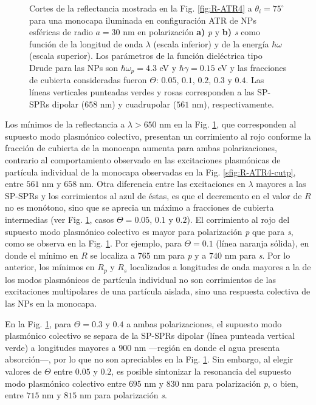 \begin{figure}[h!]
	\caption{
Cortes de la reflectancia mostrada en la Fig. \ref{fig:R-ATR4} a $\theta_i = 75^\circ$ para una monocapa iluminada en configuración ATR de NPs esféricas de radio $a=30$ nm en polarización \textbf{a)} \emph{p} y \textbf{b)} \emph{s} como función de la longitud de onda $\lambda$ (escala inferior) y de la energía $\hbar\omega$ (escala superior). Los parámetros de la función dieléctrica tipo Drude para las NPs son $\hbar\omega_p = 4.3$ eV y $\hbar\gamma = 0.15$ eV y las fracciones de cubierta consideradas fueron $\Theta$: $0. 05$, $0. 1$, $0. 2$, $0. 3$ y $0. 4$. Las líneas verticales punteadas verdes y rosas corresponden a las SP-SPRs dipolar ($658$ nm) y cuadrupolar ($561$ nm), respectivamente. }\label{fig:R-ATR4-Cuts}
	\end{figure}

Los mínimos de la reflectancia a $\lambda>650$ nm en la Fig. \ref{fig:R-ATR4-Cuts}, que corresponden al supuesto modo plasmónico colectivo, presentan un corrimiento al rojo conforme la fracción de cubierta de la monocapa aumenta  para ambas polarizaciones, contrario al comportamiento observado en las excitaciones plasmónicas de partícula individual de la monocapa observadas en la Fig. \ref{sfig:R-ATR4-cutp}, entre $561$ nm y $658$ nm. Otra diferencia entre las excitaciones en $\lambda$ mayores a las SP-SPRs y los corrimientos al azul de éstas, es que el decremento en el valor de $R$ no es monótono, sino que se aprecia un máximo a fracciones de cubierta intermedias (ver Fig. \ref{fig:R-ATR4-Cuts}, casos $\Theta=0.05$, $0.1$ y $0.2$). El corrimiento al rojo del supuesto modo plasmónico colectivo es mayor para  polarización \emph{p} que para \emph{s}, como se observa en la Fig. \ref{fig:R-ATR4-Cuts}. Por ejemplo, para $\Theta=0.1$ (línea naranja sólida), en donde el mínimo en $R$ se localiza a $765$ nm para \emph{p} y  a $740$ nm para \emph{s}. Por lo anterior, los mínimos en $R_p$ y $R_s$ localizados a longitudes de onda mayores a la de los modos plasmónicos de partícula individual no son corrimientos de las excitaciones multipolares de una partícula aislada, sino una respuesta colectiva de las NPs en la monocapa. 

En la Fig. \ref{fig:R-ATR4-Cuts}, para $\Theta = 0.3$ y $0.4$ a ambas polarizaciones, el supuesto modo plasmónico colectivo se separa de la SP-SPRs dipolar (línea punteada vertical verde) a longitudes mayores a $900$ nm ---región en donde el agua presenta absorción---, por lo que 
no son apreciables en la Fig. \ref{fig:R-ATR4-Cuts}. Sin embargo, al elegir valores de $\Theta$ entre $0.05$ y $0.2$, es posible sintonizar la resonancia del supuesto modo plasmónico colectivo entre $695$ nm y $830$ nm para polarización \emph{p}, o bien, entre $715$ nm y $815$ nm para polarización \emph{s}. 

